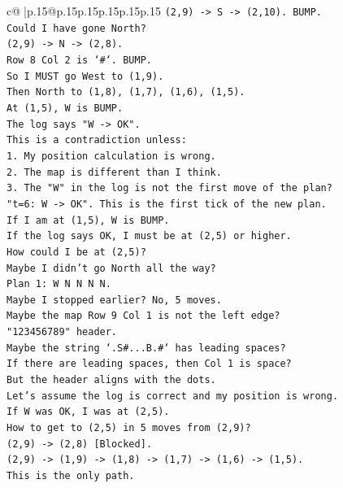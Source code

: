 \documentclass{article}
\begin{document}
{\begin{supertabular}{c@{$\;$}|p{.15\linewidth}@{}p{.15\linewidth}p{.15\linewidth}p{.15\linewidth}p{.15\linewidth}p{.15\linewidth}}
{{{\texttt{(2,9) {-}> S {-}> (2,10). BUMP.} \\
\texttt{Could I have gone North?} \\
\texttt{(2,9) {-}> N {-}> (2,8).} \\
\texttt{Row 8 Col 2 is `\#`. BUMP.} \\
\texttt{So I MUST go West to (1,9).} \\
\texttt{Then North to (1,8), (1,7), (1,6), (1,5).} \\
\texttt{At (1,5), W is BUMP.} \\
\texttt{The log says "W {-}> OK".} \\
\texttt{This is a contradiction unless:} \\
\texttt{1. My position calculation is wrong.} \\
\texttt{2. The map is different than I think.} \\
\texttt{3. The "W" in the log is not the first move of the plan?} \\
\texttt{"t=6: W {-}> OK". This is the first tick of the new plan.} \\
\texttt{If I am at (1,5), W is BUMP.} \\
\texttt{If the log says OK, I must be at (2,5) or higher.} \\
\texttt{How could I be at (2,5)?} \\
\texttt{Maybe I didn't go North all the way?} \\
\texttt{Plan 1: W N N N N.} \\
\texttt{Maybe I stopped earlier? No, 5 moves.} \\
\texttt{Maybe the map Row 9 Col 1 is not the left edge?} \\
\texttt{"123456789" header.} \\
\texttt{Maybe the string `.S\#...B.\#` has leading spaces?} \\
\texttt{If there are leading spaces, then Col 1 is space?} \\
\texttt{But the header aligns with the dots.} \\
\texttt{Let's assume the log is correct and my position is wrong.} \\
\texttt{If W was OK, I was at (2,5).} \\
\texttt{How to get to (2,5) in 5 moves from (2,9)?} \\
\texttt{(2,9) {-}> (2,8) {[}Blocked{]}.} \\
\texttt{(2,9) {-}> (1,9) {-}> (1,8) {-}> (1,7) {-}> (1,6) {-}> (1,5).} \\
\texttt{This is the only path.} \\
}}}
\end{supertabular}}
\end{document}
